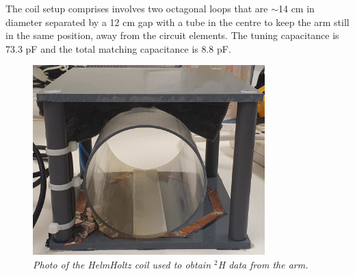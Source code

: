 The coil setup comprises involves two octagonal loops that are $\sim$14 cm in diameter separated by a 12 cm gap with a tube in the centre to keep the arm still in the same position, away from the circuit elements. The tuning capacitance is 73.3 pF and the total matching capacitance is 8.8 pF.

\begin{figure}
    \centering
    \includegraphics[width=0.8\textwidth]{Figures/Coils/HelmHoltz_Coil.jpg}
    \caption{\textit{Photo of the HelmHoltz coil used to obtain $^2$H data from the arm.}}
    \label{fig:coils:HelmHoltz_pic}
\end{figure}